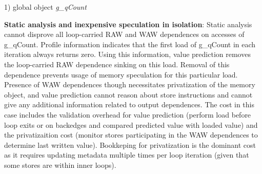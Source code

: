 

1) global object \textit{g\_qCount}

\textbf{Static analysis and inexpensive speculation in isolation}:
%
Static analysis cannot disprove all loop-carried RAW and WAW dependences on
accesses of g\_qCount.
%
Profile information indicates that the first load of g\_qCount in each iteration
always returns zero.  Using this information, value prediction removes the
loop-carried RAW dependence sinking on this load.
%
Removal of this dependence prevents usage of memory speculation for this
particular load.
%
Presence of WAW dependences though necessitates privatization of the memory
object, and value prediction cannot reason about store instructions and cannot
give any additional information related to output dependences.
%
The cost in this case includes the validation overhead for value prediction
(perform load before loop exits or on backedges and compared predicted value
with loaded value) and the privatizaition cost (monitor stores participating in
the WAW dependences to determine last written value). Bookkeping for
privatization is the dominant cost as it requires updating metadata multiple
times per loop iteration (given that some stores are within inner loops).


